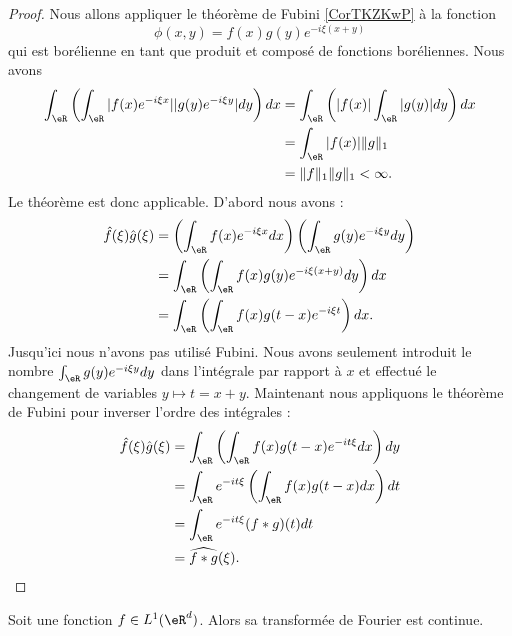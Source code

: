 \begin{proof}
    Nous allons appliquer le théorème de Fubini \ref{CorTKZKwP} à la fonction
    \begin{equation}
        \phi(x,y)=f(x)g(y) e^{-i\xi(x+y)}
    \end{equation}
    qui est borélienne en tant que produit et composé de fonctions boréliennes. Nous avons
    \begin{subequations}
        \begin{align}
            \int_{\eR}\left( \int_{\eR}| f(x) e^{-i\xi x} | |g(y) e^{-i\xi y} |dy \right)dx&=\int_{\eR}\left( | f(x) |\int_{\eR}| g(y) |dy \right)dx\\
            &=\int_{\eR}| f(x) |\| g \|_1\\
            &=\| f \|_1\| g \|_1<\infty.
        \end{align}
    \end{subequations}
    Le théorème est donc applicable. D'abord nous avons :
    \begin{subequations}
        \begin{align}
            \hat f(\xi)\hat g(\xi)&=\left(\int_{\eR}f(x) e^{-i\xi x}dx\right)\left(\int_{\eR}g(y) e^{-i\xi y}dy\right)\\
            &=\int_{\eR}\left( \int_{\eR}f(x)g(y) e^{-i\xi(x+y)}dy \right)dx\\
            &=\int_{\eR}\left( \int_{\eR}f(x)g(t-x) e^{-i\xi t} \right)dx.
        \end{align}
    \end{subequations}
    Jusqu'ici nous n'avons pas utilisé Fubini. Nous avons seulement introduit le nombre \( \int_{\eR}g(y) e^{-i\xi y}dy\) dans l'intégrale par rapport à \( x\) et effectué le changement de variables \( y\mapsto t=x+y\). Maintenant nous appliquons le théorème de Fubini pour inverser l'ordre des intégrales :
    \begin{subequations}
        \begin{align}
            \hat f(\xi)\hat g(\xi)&=\int_{\eR}\left( \int_{\eR}f(x)g(t-x) e^{-it\xi}dx \right)dy\\
            &=\int_{\eR} e^{-it\xi}\left( \int_{\eR}f(x)g(t-x)dx \right)dt\\
            &=\int_{\eR} e^{-it\xi}(f*g)(t)dt\\
            &=\widehat{f*g}(\xi).
        \end{align}
    \end{subequations}
\end{proof}

\begin{proposition}       \label{PropJvNfj}
    Soit une fonction \( f\in L^1(\eR^d)\). Alors sa transformée de Fourier est continue.
\end{proposition}

